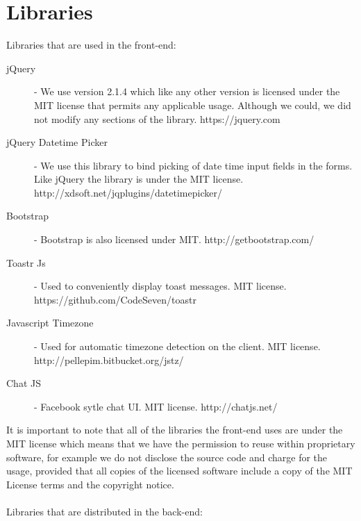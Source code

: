 \documentclass[10pt,a4paper]{article}
\begin{document}
\section{Libraries}
Libraries that are used in the front-end:
\begin{description}
\item[jQuery] - We use version 2.1.4 which like any other version is licensed 
under the MIT license that permits any applicable usage. Although we could, we 
did not modify any sections of the library. https://jquery.com
\item[jQuery Datetime Picker] - We use this library to bind picking of date time 
input fields in the forms. Like jQuery the library is under the MIT license. 
http://xdsoft.net/jqplugins/datetimepicker/
\item[Bootstrap] - Bootstrap is also licensed under MIT. 
http://getbootstrap.com/
\item[Toastr Js] - Used to conveniently display toast messages.
MIT license. https://github.com/CodeSeven/toastr
\item[Javascript Timezone] - Used for automatic timezone detection on the client.
MIT license.
\\
http://pellepim.bitbucket.org/jstz/
\item[Chat JS] - Facebook sytle chat UI. MIT license. http://chatjs.net/
\end{description}
It is important to note that all of the libraries the front-end uses are under 
the MIT license which means that we have the permission to reuse within 
proprietary software, for example we do not disclose the source code and charge 
for the usage, provided that all copies of the licensed software include a copy 
of the MIT License terms and the copyright notice. \\ \\
Libraries that are distributed in the back-end:
\end{document}
